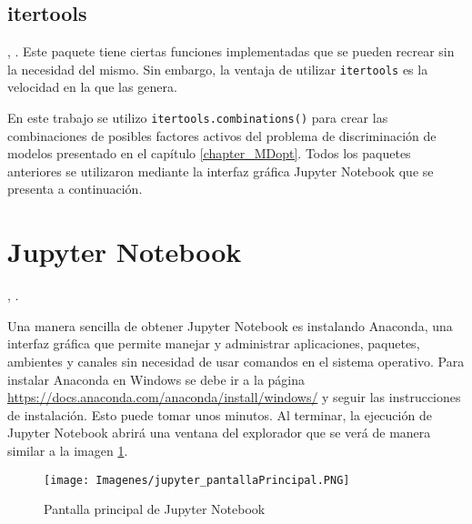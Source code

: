 \subsection{itertools}
, \cite{doc_python}. Este paquete tiene ciertas funciones implementadas que se pueden recrear sin la necesidad del mismo. Sin embargo, la ventaja de utilizar \texttt{itertools} \citep{software_python} es la velocidad en la que las genera. 

En este trabajo se utilizo \texttt{itertools.combinations()} para crear las combinaciones de posibles factores activos del problema de discriminación de modelos presentado en el capítulo \ref{chapter_MDopt}. Todos los paquetes anteriores se utilizaron mediante la interfaz gráfica \textsf{Jupyter Notebook} que se presenta a continuación.

\section{Jupyter Notebook} \label{cap_jupyter}
, \cite{jupyter_page}. 

Una manera sencilla de obtener \textsf{Jupyter Notebook} es instalando \textsf{Anaconda}, una interfaz gráfica que permite manejar y administrar aplicaciones, paquetes, ambientes y canales sin necesidad de usar comandos en el sistema operativo. Para instalar Anaconda en \textsf{Windows} se debe ir a la página \url{https://docs.anaconda.com/anaconda/install/windows/} y seguir las instrucciones de instalación. Esto puede tomar unos minutos. Al terminar, la ejecución de \textsf{Jupyter Notebook} abrirá una ventana del explorador que se verá de manera similar a la imagen \ref{jupyter_pantallaPrincipal}. 


\begin{figure}[h]
	\begin{center}
		\texttt{[image: Imagenes/jupyter\_pantallaPrincipal.PNG]}
		\caption{Pantalla principal de Jupyter Notebook}
		\label{jupyter_pantallaPrincipal}
	\end{center}
\end{figure}


